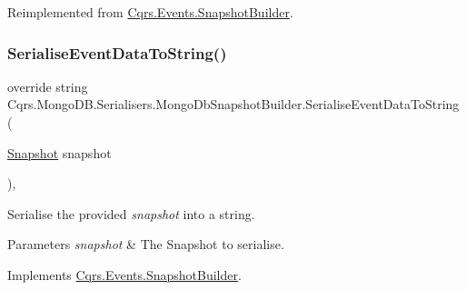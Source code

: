 Reimplemented from \hyperlink{classCqrs_1_1Events_1_1SnapshotBuilder_a1329007abf3aa02e4cddbebc669e4209_a1329007abf3aa02e4cddbebc669e4209}{Cqrs.\+Events.\+Snapshot\+Builder}.

\mbox{\label{classCqrs_1_1MongoDB_1_1Serialisers_1_1MongoDbSnapshotBuilder_a47770b61682197c725848255fc0e703f_a47770b61682197c725848255fc0e703f}} 
\subsubsection{\texorpdfstring{Serialise\+Event\+Data\+To\+String()}{SerialiseEventDataToString()}}
{\footnotesize\ttfamily override string Cqrs.\+Mongo\+D\+B.\+Serialisers.\+Mongo\+Db\+Snapshot\+Builder.\+Serialise\+Event\+Data\+To\+String (\begin{DoxyParamCaption}\item[{\hyperlink{classCqrs_1_1Snapshots_1_1Snapshot}{Snapshot}}]{snapshot }\end{DoxyParamCaption})\hspace{0.3cm}{\ttfamily [protected]}, {\ttfamily [virtual]}}



Serialise the provided {\itshape snapshot}  into a string. 


\begin{DoxyParams}{Parameters}
{\em snapshot} & The Snapshot to serialise.\\
\hline
\end{DoxyParams}


Implements \hyperlink{classCqrs_1_1Events_1_1SnapshotBuilder_a68fb9e6a5f6f78c01df6802a7f45387f_a68fb9e6a5f6f78c01df6802a7f45387f}{Cqrs.\+Events.\+Snapshot\+Builder}.

